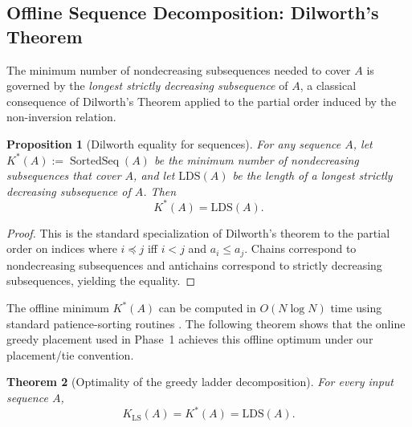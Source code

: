 \documentclass[12pt,a4paper]{article}
\theoremstyle{plain}
\newtheorem{theorem}{Theorem}[section]
\newtheorem{proposition}[theorem]{Proposition}
\theoremstyle{definition}
\DeclareMathOperator{\SortedSeq}{SortedSeq}
\begin{document}
\subsection{Offline Sequence Decomposition: Dilworth's Theorem}
\label{sec:dilworth}

The minimum number of nondecreasing subsequences needed to cover $A$ is
governed by the \emph{longest strictly decreasing subsequence} of $A$, a
classical consequence of Dilworth's Theorem \cite{Dilworth1950} applied to
the partial order induced by the non-inversion relation.

\begin{proposition}[Dilworth equality for sequences]
\label{prop:dilworth}
For any sequence $A$, let $K^*(A) := \SortedSeq(A)$ be the minimum number
of nondecreasing subsequences that cover $A$, and let $\mathrm{LDS}(A)$ be
the length of a longest strictly decreasing subsequence of $A$.  Then
\[ K^*(A) = \mathrm{LDS}(A). \]
\end{proposition}

\begin{proof}
This is the standard specialization of Dilworth's theorem to the partial
order on indices where $i \preceq j$ iff $i<j$ and $a_i \le a_j$.  Chains
correspond to nondecreasing subsequences and antichains correspond to
strictly decreasing subsequences, yielding the equality.
\end{proof}

The offline minimum $K^*(A)$ can be computed in $O(N\log N)$ time using
standard patience-sorting routines \cite{Fredman1975,AldousDiaconis1999}.
The following theorem shows that the online greedy placement used in
Phase~1 achieves this offline optimum under our placement/tie convention.

\begin{theorem}[Optimality of the greedy ladder decomposition]
\label{thm:greedy_optimal}
For every input sequence $A$,
\[ K_{\mathrm{LS}}(A) = K^*(A) = \mathrm{LDS}(A). \]
\end{theorem}
\end{document}
